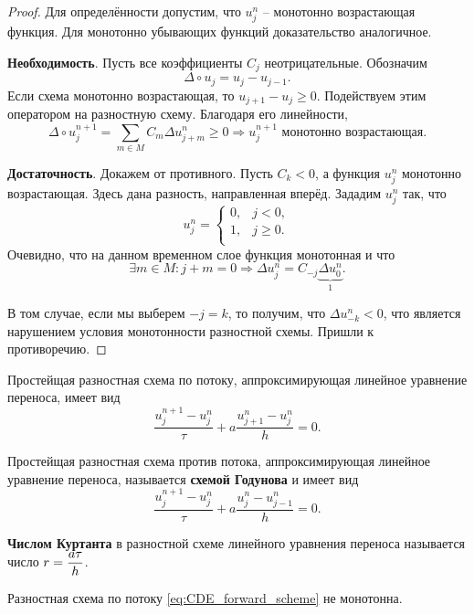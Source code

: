 \documentclass[../main.tex]{subfile}
\begin{document}
\begin{proof}
	Для определённости допустим, что $u_j^n$ -- монотонно возрастающая
	функция. Для монотонно убывающих функций доказательство аналогичное.
	
	\textbf{Необходимость}. Пусть все коэффициенты $C_j$ неотрицательные.
	Обозначим
	\[\Delta\circ u_j=u_j-u_{j-1}.\]
	Если схема монотонно возрастающая, то $u_{j+1}-u_j\ge 0$. Подействуем
	этим оператором на разностную схему. Благодаря его линейности,
	\[\Delta\circ u_j^{n+1}=\sum_{m\in M}C_m\Delta u_{j+m}^{n}\ge 0
	\Rightarrow u_j^{n+1}\text{ монотонно возрастающая}.\]

	\textbf{Достаточность}. Докажем от противного. Пусть $C_k<0$, а функция
	$u_j^n$ монотонно возрастающая. Здесь дана разность, направленная
	вперёд. Зададим $u_j^n$ так, что
	\[
		u_j^n=
		\begin{cases}
			0, & j < 0, \\
			1, & j\ge 0. \\
		\end{cases}
	\]
	Очевидно, что на данном временном слое функция монотонная и что
	\[\exists m\in M:j+m=0\Rightarrow
	\Delta u_j^n=C_{-j}\underset{1}{\underbrace{\Delta u_0^n}}.\]

	В том случае, если мы выберем $-j=k$, то получим, что
	$\Delta u_{-k}^n<0$, что является нарушением условия монотонности
	разностной схемы. Пришли к противоречию.
\end{proof}

\begin{define}\label{eq:CDE_forward_scheme}
	Простейщая разностная схема по потоку, аппроксимирующая линейное
	уравнение переноса, имеет вид
	\[\frac{u_j^{n+1}-u_j^n}{\tau}+a\frac{u_{j+1}^n-u_j^n}{h}=0.\]
\end{define}

\begin{define}\label{eq:CDE_backward_scheme}
	Простейщая разностная схема против потока, аппроксимирующая линейное
	уравнение переноса, называется \textbf{схемой Годунова} и имеет вид
	\[\frac{u_j^{n+1}-u_j^n}{\tau}+a\frac{u_j^n-u_{j-1}^n}{h}=0.\]
\end{define}

\begin{define}
	\textbf{Числом Куртанта} в разностной схеме линейного уравнения переноса
	называется число $\mathlarger{r=\frac{a\tau}{h}}$.
\end{define}

\begin{lemma}
	Разностная схема по потоку \eqref{eq:CDE_forward_scheme} не монотонна.
\end{lemma}
\end{document}
